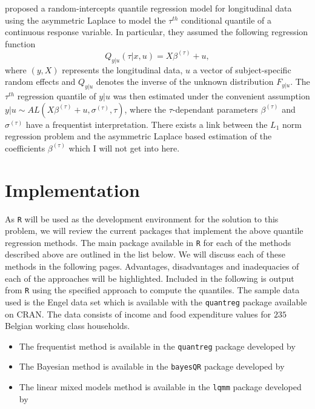 \documentclass[12pt,a4paper]{report}
\begin{document}
\citet{lqmm} proposed a random-intercepts quantile regression model for longitudinal data using the asymmetric Laplace to model the $\tau^{th}$ conditional quantile of a continuous response variable. In particular, they assumed the following regression function
$$ Q_{y|u}(\tau|x,u)=X\beta^{(\tau)} + u,$$
where $(y,X)$ represents the longitudinal data, $u$ a vector of subject-specific random effects and $Q_{y|u}$ denotes the inverse of the unknown distribution $F_{y|u}$. The $\tau^{th}$ regression quantile of $y|u$ was then estimated under the convenient assumption $y|u\sim AL(X\beta^{(\tau)}+u,\sigma^{(\tau)}, \tau)$, where the $\tau$-dependant parameters $\beta^{(\tau)}$ and $\sigma^{(\tau)}$ have a frequentist interpretation. There exists a link between the $L_{1}$ norm regression problem and the asymmetric Laplace based estimation of the coefficients $\beta^{(\tau)}$ which I will not get into here.

\newpage
\section{Implementation}
As {\small\verb"R"} \citep{R} will be used as the development environment for the solution to this problem, we will review the current packages that implement the above quantile regression methods. The main package available in {\small\verb"R"} for each of the methods described above are outlined in the list below. We will discuss each of these methods in the following pages. Advantages, disadvantages and inadequacies of each of the approaches will be highlighted. Included in the following is output from {\small\verb"R"} using the specified approach to compute the quantiles. The sample data used is the Engel data set which is available with the {\small\verb"quantreg"} package available on CRAN. The data consists of income and food expenditure values for $235$ Belgian working class households.

\begin{itemize}
    \item The frequentist method is available in the {\small\verb"quantreg"} package developed by \citet{R-quantreg}
    \item The Bayesian method is available in the {\small\verb"bayesQR"} package developed by \citet{R-bayesQR}
    \item The linear mixed models method is available in the {\small\verb"lqmm"} package developed by \citet{R-lqmm}
\end{itemize}
\end{document}
